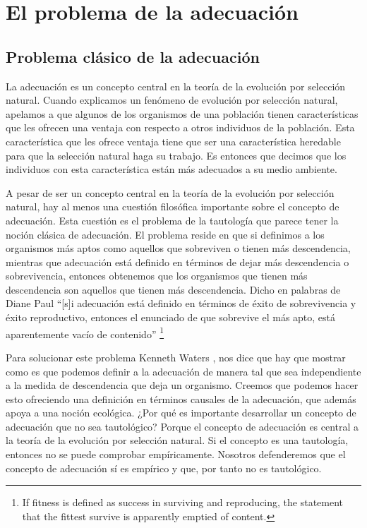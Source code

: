 
\chapter{El problema de la adecuación}

\section{Problema clásico de la adecuación}

\noindent La adecuación es un concepto central en la teoría de la evolución por selección natural. Cuando explicamos un fenómeno de evolución por selección natural, apelamos a que algunos de los organismos de una población tienen características que les ofrecen una ventaja con respecto a otros individuos de la población. Esta característica que les ofrece ventaja tiene que ser una característica heredable para que la selección natural haga su trabajo. Es entonces que decimos que los individuos con esta característica están más adecuados a su medio ambiente.

A pesar de ser un concepto central en la teoría de la evolución por selección natural, hay al menos una cuestión filosófica importante sobre el concepto de adecuación. Esta cuestión es el problema de la tautología que parece tener la noción clásica de adecuación. El problema reside en que si definimos a los organismos más aptos como aquellos que sobreviven o tienen más descendencia, mientras que adecuación está definido en términos de dejar más descendencia o sobrevivencia, entonces obtenemos que los organismos que tienen más descendencia son aquellos que tienen más descendencia. Dicho en palabras de Diane Paul ``[s]i adecuación está definido en términos de éxito de sobrevivencia y éxito reproductivo, entonces el enunciado de que sobrevive el más apto, está aparentemente vacío de contenido'' \footnote{If fitness is defined as success in surviving and reproducing, the statement that the fittest survive is apparently emptied of content.} \citeyear{Paul1992}

Para solucionar este problema Kenneth Waters \citeyear{Waters1986}, nos dice que hay que mostrar como es que podemos definir a la adecuación de manera tal que sea independiente a la medida de descendencia que deja un organismo. Creemos que podemos hacer esto ofreciendo una definición en términos causales de la adecuación, que además apoya a una noción ecológica. ¿Por qué es importante desarrollar un concepto de adecuación que no sea tautológico? Porque el concepto de adecuación es central a la teoría de la evolución por selección natural. Si el concepto es una tautología, entonces no se puede comprobar empíricamente. Nosotros defenderemos que el concepto de adecuación sí es empírico y que, por tanto no es tautológico.

